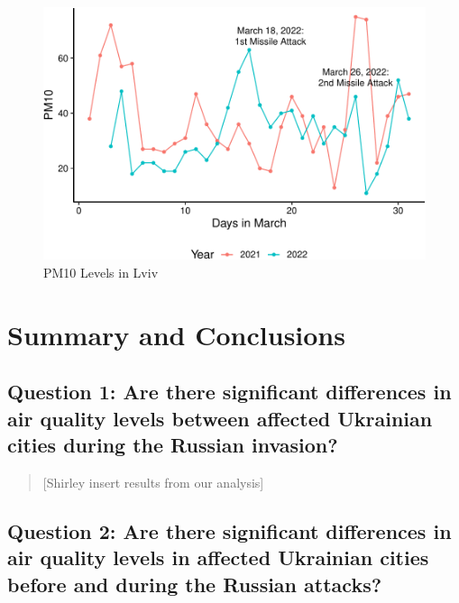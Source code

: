 \documentclass[
  12pt,
]{article}
\begin{document}
\begin{figure}
\centering
\includegraphics{Fontanie_Gordon_Weinberg_Project_files/figure-latex/visualizing PM10 in Lviv-1.pdf}
\caption{PM10 Levels in Lviv}
\end{figure}

\newpage

\hypertarget{summary-and-conclusions}{%
\section{Summary and Conclusions}\label{summary-and-conclusions}}

\hypertarget{question-1-are-there-significant-differences-in-air-quality-levels-between-affected-ukrainian-cities-during-the-russian-invasion-1}{%
\subsection{Question 1: Are there significant differences in air quality
levels between affected Ukrainian cities during the Russian
invasion?}\label{question-1-are-there-significant-differences-in-air-quality-levels-between-affected-ukrainian-cities-during-the-russian-invasion-1}}

\begin{quote}
{[}Shirley insert results from our analysis{]}
\end{quote}

\hypertarget{question-2-are-there-significant-differences-in-air-quality-levels-in-affected-ukrainian-cities-before-and-during-the-russian-attacks-1}{%
\subsection{Question 2: Are there significant differences in air quality
levels in affected Ukrainian cities before and during the Russian
attacks?}\label{question-2-are-there-significant-differences-in-air-quality-levels-in-affected-ukrainian-cities-before-and-during-the-russian-attacks-1}}
\end{document}
